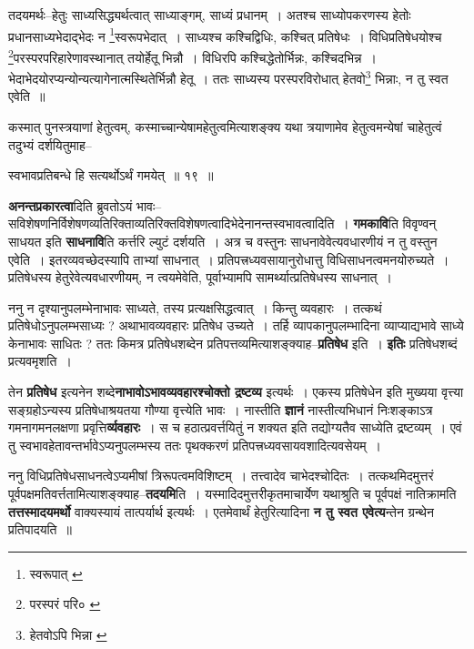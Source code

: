 \documentclass[article,12pt,a4paper]{memoir}
\begin{document}
	  \pstart तदयमर्थः--हेतुः साध्यसिद्ध्यर्थत्वात् साध्याङ्गम्, साध्यं प्रधानम् । अतश्च साध्योपकरणस्य हेतोः प्रधानसाध्यभेदाद्भेदः न \footnote{स्वरूपात् \cite{dp-msC}}स्वरूपभेदात् । साध्यश्च कश्चिद्विधिः, कश्चित् प्रतिषेधः । विधिप्रतिषेधयोश्च \footnote{परस्परं परि० \cite{dp-msB} \cite{dp-msD}}परस्परपरिहारेणावस्थानात् तयोर्हेतू भिन्नौ । विधिरपि कश्चिद्धेतोर्भिन्नः, कश्चिदभिन्न । भेदाभेदयोरप्यन्योन्यत्यागेनात्मस्थितेर्भिन्नौ हेतू । ततः साध्यस्य परस्परविरोधात् हेतवो\footnote{हेतवोऽपि भिन्ना \cite{dp-msB}} भिन्नाः, न तु स्वत एवेति ॥
	\pend
       

	  \pstart कस्मात् पुनस्त्रयाणां हेतुत्वम्, कस्माच्चान्येषामहेतुत्वमित्याशङ्क्य यथा त्रयाणामेव हेतुत्वमन्येषां चाहेतुत्वं तदुभ्यं दर्शयितुमाह--
	\pend
      

	  \pstart स्वभावप्रतिबन्धे हि सत्यर्थोऽर्थं गमयेत् ॥ १९ ॥
	\pend
      

	  \pstart \textbf{अनन्तप्रकारत्वा}दिति ब्रुवतोऽयं भावः--सविशेषणनिर्विशेषणव्यतिरिक्ताव्यतिरिक्तविशेषणत्वादिभेदेनानन्तस्वभावत्वादिति । \textbf{गमकावि}ति विवृण्वन् साधयत इति \textbf{साधनावि}ति कर्त्तरि ल्युटं दर्शयति । अत्र च वस्तुनः साधनावेवेत्यवधारणीयं न तु वस्तुन एवेति । इतरव्यवच्छेदस्यापि ताभ्यां साधनात् । प्रतिपत्त्रध्यवसायानुरोधात्तु विधिसाधनत्वमनयोरुच्यते । प्रतिषेधस्य हेतुरेवेत्यवधारणीयम्, न त्वयमेवेति, पूर्वाभ्यामपि सामर्थ्यात्प्रतिषेधस्य साधनात् ।
	\pend
      

	  \pstart ननु न दृश्यानुपलम्भेनाभावः साध्यते, तस्य प्रत्यक्षसिद्धत्वात् । किन्तु व्यवहारः । तत्कथं प्रतिषेधोऽनुपलम्भसाध्यः ? अथाभावव्यवहारः प्रतिषेध उच्यते । तर्हि व्यापकानुपलम्भादिना व्याप्याद्यभावे साध्ये केनाभावः साधितः ? ततः किमत्र प्रतिषेधशब्देन प्रतिपत्तव्यमित्याशङ्क्याह--\textbf{प्रतिषेध} इति । \textbf{इतिः} प्रतिषेधशब्दं प्रत्यवमृशति ।
	\pend
      

	  \pstart तेन \textbf{प्रतिषेध} इत्यनेन शब्दे\textbf{नाभावोऽभावव्यवहारश्चोक्तो द्रष्टव्य} इत्यर्थः । एकस्य प्रतिषेधेन इति मुख्यया वृत्त्या सङ्ग्रहोऽन्यस्य प्रतिषेधाश्रयतया गौण्या वृत्त्येति भावः । नास्तीति \textbf{ज्ञानं} नास्तीत्यभिधानं निःशङ्काऽत्र गमनागमनलक्षणा प्रवृत्ति\textbf{र्व्यवहारः} । स च हठात्प्रवर्त्तयितुं न शक्यत इति तद्योग्यतैव साध्येति द्रष्टव्यम् । एवं तु स्वभावहेतावन्तर्भावेऽप्यनुपलम्भस्य ततः पृथक्करणं प्रतिपत्त्रध्यवसायवशादित्यवसेयम् ।
	\pend
      

	  \pstart ननु विधिप्रतिषेधसाधनत्वेऽप्यमीषां त्रिरूपत्वमविशिष्टम् । तत्त्वादेव चाभेदश्चोदितः । तत्कथमिदमुत्तरं पूर्वपक्षमतिवर्त्ततामित्याशङ्क्याह--\textbf{तदयमि}ति । यस्मादिदमुत्तरीकृतमाचार्येण यथाश्रुति च पूर्वपक्षं नातिक्रामति \textbf{तत्तस्मादयमर्थो} वाक्यस्यायं तात्पर्यार्थ इत्यर्थः । एतमेवार्थं हेतुरित्यादिना \textbf{न तु स्वत एवेत्य}न्तेन ग्रन्थेन प्रतिपादयति ॥
	\pend
      
\end{document}
